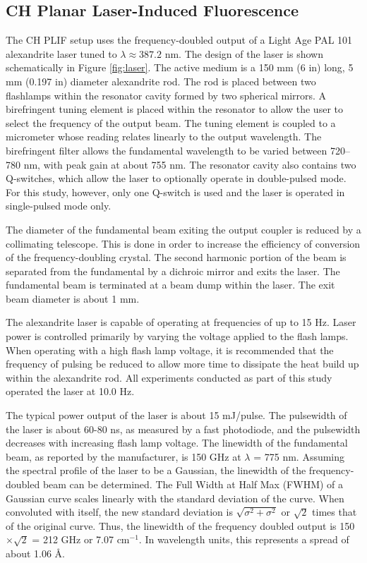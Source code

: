 \subsection{CH Planar Laser-Induced Fluorescence}
\label{subsec:experimental-ch-planar-laser-induced-fluorescence}



The CH PLIF setup uses the frequency-doubled output of a Light Age PAL 101 alexandrite laser tuned to \(\lambda \approx 387.2\) nm.
The design of the laser is shown schematically in Figure \ref{fig:laser}.
The active medium is a 150 mm (6 in) long, 5 mm (0.197 in) diameter alexandrite rod.
The rod is placed between two flashlamps within the resonator cavity formed by two spherical mirrors.
A birefringent tuning element is placed within the resonator to allow the user to select the frequency of the output beam.
The tuning element is coupled to a micrometer whose reading relates linearly to the output wavelength.
The birefringent filter allows the fundamental wavelength to be varied between 720--780 nm, with peak gain at about 755 nm.
The resonator cavity also contains two Q-switches, which allow the laser to optionally operate in double-pulsed mode.
For this study, however, only one Q-switch is used and the laser is operated in single-pulsed mode only.

The diameter of the fundamental beam exiting the output coupler is reduced by a collimating telescope.
This is done in order to increase the efficiency of conversion of the frequency-doubling crystal.
The second harmonic portion of the beam is separated from the fundamental by a dichroic mirror and exits the laser.
The fundamental beam is terminated at a beam dump within the laser.
The exit beam diameter is about 1 mm.

The alexandrite laser is capable of operating at frequencies of up to 15 Hz.
Laser power is controlled primarily by varying the voltage applied to the flash lamps.
When operating with a high flash lamp voltage, it is recommended that the frequency of pulsing be reduced to allow more time to dissipate the heat build up within the alexandrite rod.
All experiments conducted as part of this study operated the laser at 10.0 Hz.

The typical power output of the laser is about 15 mJ/pulse.
The pulsewidth of the laser is about 60-80 ns, as measured by a fast photodiode, and the pulsewidth decreases with increasing flash lamp voltage.
The linewidth of the fundamental beam, as reported by the manufacturer, is 150 GHz at \(\lambda\) = 775 nm.
Assuming the spectral profile of the laser to be a Gaussian, the linewidth of the frequency-doubled beam can be determined.
The Full Width at Half Max (FWHM) of a Gaussian curve scales linearly with the standard deviation of the curve.
When convoluted with itself, the new standard deviation is \(\sqrt{\sigma^2 + \sigma^2}\) or \(\sqrt{2}\) times that of the original curve.
Thus, the linewidth of the frequency doubled output is 150 \(\times\sqrt{2}\) = 212 GHz or 7.07 cm\(^{-1}\).
In wavelength units, this represents a spread of about 1.06 \AA.

